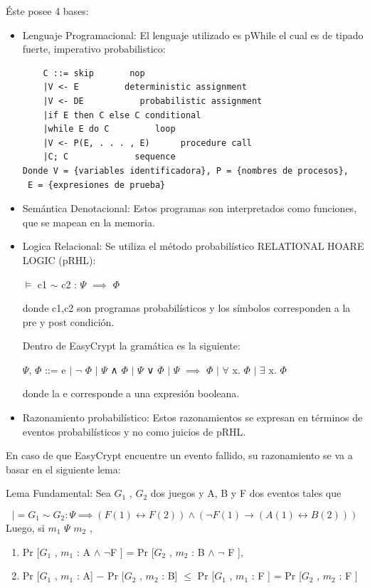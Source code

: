 \documentclass[runningheads,a4paper]{llncs}
\begin{document}
Éste posee 4 bases:
\begin{itemize}
	\item Lenguaje Programacional:
El lenguaje utilizado es pWhile el cual es de tipado fuerte, imperativo probabilistico:

\begin{Verbatim}
	C ::= skip		 nop
	|V <- E		    deterministic assignment
	|V <- DE		   probabilistic assignment
	|if E then C else C	conditional
	|while E do C	      loop
	|V <- P(E, . . . , E)      procedure call
	|C; C		      sequence
Donde V = {variables identificadora}, P = {nombres de procesos},
 E = {expresiones de prueba}
\end{Verbatim}

	\item Semántica Denotacional:
Estos programas son interpretados como funciones, que se mapean en la memoria.

	\item Logica Relacional: Se utiliza el método probabilístico RELATIONAL HOARE LOGIC (pRHL):
		
\centerline{$\models$ c1 $\sim$ c2 : $\Psi$ $\implies$ $\Phi$}	
			
donde c1,c2 son programas probabilísticos y los símbolos corresponden a la pre y post condición.

Dentro de EasyCrypt la gramática es la siguiente:

\centerline{$\Psi$, $\Phi$ ::= e $\mid$ $\neg$ $\Phi$ $\mid$ $\Psi$ ∧ $\Phi$ $\mid$ $\Psi$ ∨ $\Phi$ $\mid$ $\Psi$ $\implies$ $\Phi$ $\mid$ $\forall$ x. $\Phi$ $\mid$ $\exists$ x. $\Phi$}

donde la e corresponde a una expresión booleana.


	\item Razonamiento probabilístico:
Estos razonamientos se expresan en términos de eventos probabilísticos y no como juicios de pRHL.\cite{article3}

\end{itemize}
En caso de que EasyCrypt encuentre un evento fallido, su razonamiento se va a basar en el siguiente lema:
\begin{lemma}{Lema Fundamental:}
Sea $G_1$ , $G_2$ dos juegos y A, B y F dos eventos tales que

\[|= G_1 ∼ G_2 : \Psi \implies (F(1) \leftrightarrow F(2)) \land (\neg F(1) \rightarrow (A(1) \leftrightarrow B(2)))\]
Luego, si $m_1$ $\Psi$ $m_2$ ,
\begin{enumerate}
	\item Pr [$G_1$ , $m_1$ : A $\land$ $\neg$F ] = Pr [$G_2$ , $m_2$ : B $\land$ $\neg$ F ],
	\item Pr [$G_1$ , $m_1$ : A] − Pr [$G_2$ , $m_2$ : B] $\leq$  Pr [$G_1$ , $m_1$ : F ] = Pr [$G_2$ , $m_2$ : F ]
\end{enumerate}
\end{lemma}
\end{document}
